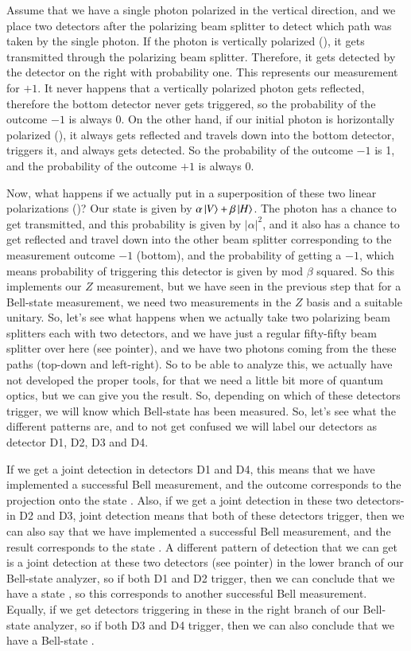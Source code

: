 Assume that we have a single photon polarized in the vertical direction, and we place two detectors after the polarizing beam splitter to detect which path was taken by the single photon. If the photon is vertically polarized (), it gets transmitted through the polarizing beam splitter. Therefore, it gets detected by the detector on the right with probability one. This represents our measurement for $+1$. It never happens that a vertically polarized photon gets reflected, therefore the bottom detector never gets triggered, so the probability of the outcome $-1$ is always 0. On the other hand, if our initial photon is horizontally polarized (), it always gets reflected and travels down into the bottom detector, triggers it, and always gets detected. So the probability of the outcome $-1$ is 1, and the probability of the outcome $+1$ is always 0.

Now, what happens if we actually put in a superposition of these two linear polarizations ()? Our state is given by $\alpha\left| V \right\rangle + \beta \left| H \right\rangle$. The photon has a chance to get transmitted, and this probability is given by $|\alpha|^2$, and it also has a chance to get reflected and travel down into the other beam splitter corresponding to the measurement outcome  $-1$ (bottom), and the probability of getting a  $-1$, which means probability of triggering this detector is given by mod $\beta$ squared. So this implements our $Z$ measurement, but we have seen in the previous step that for a Bell-state measurement, we need two measurements in the $Z$ basis and a suitable unitary. So, let's see what happens when we actually take two polarizing beam splitters each with two detectors, and we have just a regular fifty-fifty beam splitter over here (see pointer), and we have two photons coming from the these paths (top-down and left-right). So to be able to analyze this, we actually have not developed the proper tools, for that we need a little bit more of quantum optics, but we can give you the result. So, depending on which of these detectors trigger, we will know which Bell-state has been measured. So, let's see what the different patterns are, and to not get confused we will label our detectors as detector D1, D2, D3 and D4.

If we get a joint detection in detectors D1 and D4, this means that we have implemented a successful Bell measurement, and the outcome corresponds to the projection onto the state \ket{\Psi^-}. Also, if we get a joint detection in these two detectors- in D2 and D3, joint detection means that both of these detectors trigger, then we can also say that we have implemented a successful Bell measurement, and the result corresponds to the state \ket{\Psi^-}. A different pattern of detection that we can get is a joint detection at these two detectors (see pointer) in the lower branch of our Bell-state analyzer, so if both D1 and D2 trigger, then we can conclude that we have a state \ket{\Psi^+}, so this corresponds to another successful Bell measurement. Equally, if we get detectors triggering in these in the right branch of our Bell-state analyzer, so if both D3 and D4 trigger, then we can also conclude that we have a Bell-state \ket{\Psi^+}.

